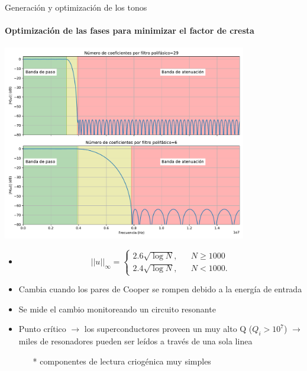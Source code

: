 \documentclass[ignorenonframetext,12pt]{beamer}
\begin{document}
\begin{frame}{Generación y optimización de los tonos}
	\framesubtitle{Optimización de las fases para minimizar el factor de cresta}
	\centering
	\qquad \includegraphics[width=0.8\textwidth]{c4_proto_compa}
	\begin{itemize}
		\item 
			\begin{equation}\label{eq_fc_aleatorios}
  ||u||_\infty = \left\{\begin{array}{rcl}
    2.6 \sqrt{\log{N}}, && N \geq 1000\\
    2.4 \sqrt{\log{N}}, && N < 1000.
  \end{array}\right.
\end{equation}

		\item Cambia cuando los pares de Cooper se rompen debido a la
			energía de entrada
		\item Se mide el cambio monitoreando un circuito resonante
		\item Punto crítico $\to$ los \alert{superconductores proveen un muy
			alto Q} ($Q_i > 10^7$) $\to$ miles de resonadores
			pueden ser leídos a través de una sola linea 
			\begin{itemize}
				\item[*] \scriptsize{{\color{blue}componentes de lectura criogénica muy
					simples}}
			\end{itemize}
	\end{itemize}
\end{frame}
\end{document}
